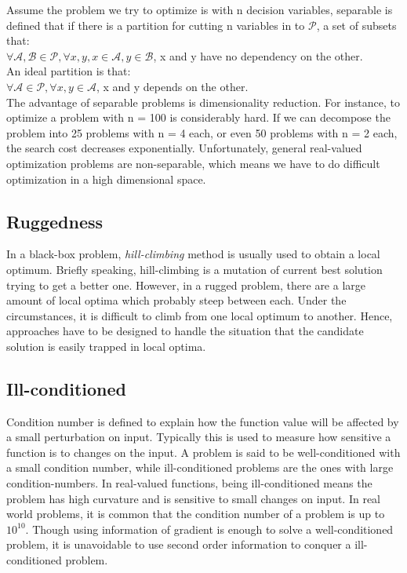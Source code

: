 Assume the problem we try to optimize is with n decision variables, separable is defined that if there is a partition for cutting n variables in to $\mathcal{P}$, a set of subsets that:\\
$\forall \mathcal{A}, \mathcal{B} \in \mathcal{P}, \forall x, y, x \in \mathcal{A} , y \in \mathcal{B}$, x and y have no dependency on the other.\\
An ideal partition is that:\\
$\forall \mathcal{A} \in \mathcal{P}, \forall x, y \in \mathcal{A}$, x and y depends on the other.\\
The advantage of separable problems is dimensionality reduction.
For instance, to optimize a problem with n = 100 is considerably hard.
If we can decompose the problem into 25 problems with n = 4 each, or
even 50 problems with n = 2 each, the search cost decreases
exponentially.
Unfortunately, general real-valued optimization problems are
non-separable, which means we have to do difficult optimization in
a high dimensional space.

\subsection{Ruggedness}

In a black-box problem, \emph{hill-climbing} method is usually used to
obtain a local optimum.
Briefly speaking, hill-climbing is a mutation of current best solution
trying to get a better one.
However, in a rugged problem, there are a large amount of local optima
which probably steep between each.
Under the circumstances, it is difficult to climb from one local optimum to another.
Hence, approaches have to be designed to handle the situation that the
candidate solution is easily trapped in local optima.

\subsection{Ill-conditioned}

Condition number is defined to explain how the function value will be
affected by a small perturbation on input.
Typically this is used to measure how sensitive a function is to changes
on the input.
A problem is said to be well-conditioned with a small condition number,
while ill-conditioned problems are the ones with large
condition-numbers.
In real-valued functions, being ill-conditioned means the problem has
high curvature and is sensitive to small changes on input.
In real world problems, it is common that the condition number of a
problem is up to $10^{10}$.
Though using information of gradient is enough to solve a
well-conditioned problem, it is unavoidable to use second order
information to conquer a ill-conditioned problem.

